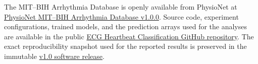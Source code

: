 The MIT--BIH Arrhythmia Database is openly available from PhysioNet at \href{https://physionet.org/content/mitdb/1.0.0/}{PhysioNet MIT--BIH Arrhythmia Database v1.0.0}. Source code, experiment configurations, trained models, and the prediction arrays used for the analyses are available in the public \href{https://github.com/alirezaabbaszadeh/ECG_Heartbeat_Classification}{ECG Heartbeat Classification GitHub repository}. The exact reproducibility snapshot used for the reported results is preserved in the immutable \href{https://github.com/alirezaabbaszadeh/ECG_Heartbeat_Classification/releases/tag/v1.0}{v1.0 software release}.
